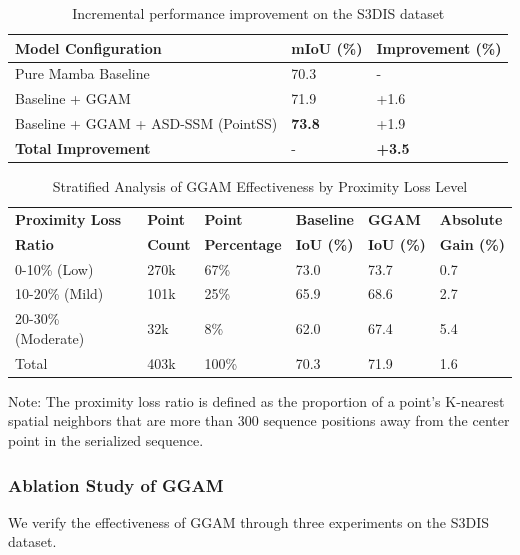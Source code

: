 \documentclass[a4paper,fleqn]{cas-sc}
\begin{document}
\begin{table}[!t]
	\centering
	\caption{Incremental performance improvement on the S3DIS dataset}
	\label{tab:progressive_improvement}
	\begin{tabular}{lll}
		\toprule
		\textbf{Model Configuration} & \textbf{mIoU (\%)} & \textbf{Improvement (\%)} \\
		\midrule
		Pure Mamba Baseline & 70.3 & - \\
		Baseline + GGAM & 71.9 & +1.6 \\
		Baseline + GGAM + ASD-SSM (PointSS) & \textbf{73.8} & +1.9 \\
		\midrule
		\textbf{Total Improvement} & - & \textbf{+3.5} \\
		\bottomrule
	\end{tabular}
\end{table}

\begin{table}[!t]
	\centering
	\caption{Stratified Analysis of GGAM Effectiveness by Proximity Loss Level}
	\label{tab:ggam_fragmentation}
	\begin{tabular}{llllll}
		\toprule
		\textbf{Proximity Loss} & \textbf{Point} & \textbf{Point} & \textbf{Baseline} & \textbf{GGAM} & \textbf{Absolute} \\
		\textbf{Ratio} & \textbf{Count} & \textbf{Percentage} & \textbf{IoU (\%)} & \textbf{IoU (\%)} & \textbf{Gain (\%)} \\
		\midrule
		0-10\% (Low) & 270k & 67\% & 73.0 & 73.7 & 0.7 \\
		10-20\% (Mild) & 101k & 25\% & 65.9 & 68.6 & 2.7 \\
		20-30\% (Moderate) & 32k & 8\% & 62.0 & 67.4 & 5.4 \\
		\midrule
		Total & 403k & 100\% & 70.3 & 71.9 & 1.6 \\
		\bottomrule
	\end{tabular}
	\par\vspace{3pt}
	\footnotesize Note: The proximity loss ratio is defined as the proportion of a point's K-nearest spatial neighbors that are more than 300 sequence positions away from the center point in the serialized sequence.
\end{table}
\subsubsection{Ablation Study of GGAM}

We verify the effectiveness of GGAM through three experiments on the S3DIS dataset.
\end{document}
